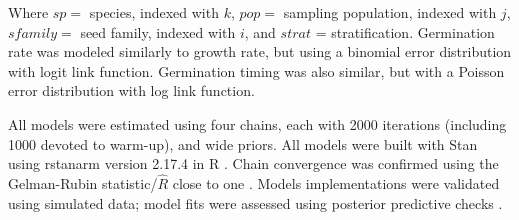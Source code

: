 \documentclass[12pt]{article}\usepackage[]{graphicx}\usepackage[]{color}
\begin{document}
	 Where $sp = $ species, indexed with $k$, $pop =$ sampling population, indexed with $j$, $sfamily =$ seed family, indexed with $i$, and $strat$ = stratification. Germination rate was modeled similarly to growth rate, but using a binomial error distribution with logit link function. Germination timing was also similar, but with a Poisson error distribution with log link function. 
	 	
	All models were estimated using four chains, each with 2000 iterations (including 1000 devoted to warm-up), and wide priors. All models were built with Stan \parencite{Carpenter2017} using rstanarm version 2.17.4 \parencite{Goodrich2018} in R \parencite{Team2015}. Chain convergence was confirmed using the Gelman-Rubin statistic/$\hat{R}$ close to one \parencite{Gelman1992}. Models implementations were validated using simulated data; model fits were assessed using posterior predictive checks \parencite{Gelman2004}.  
	
\end{document}
